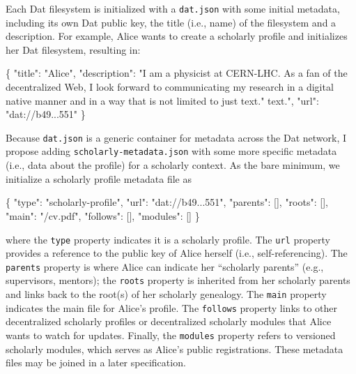 \documentclass[publications,article,submit,moreauthors,pdftex,10pt,a4paper]{Definitions/mdpi}
\newenvironment{Shaded}{\begin{snugshade}}{\end{snugshade}}
\newcommand{\DataTypeTok}[1]{\textcolor[rgb]{0.13,0.29,0.53}{#1}}
\newcommand{\FunctionTok}[1]{\textcolor[rgb]{0.00,0.00,0.00}{#1}}
\newcommand{\OtherTok}[1]{\textcolor[rgb]{0.56,0.35,0.01}{#1}}
\newcommand{\StringTok}[1]{\textcolor[rgb]{0.31,0.60,0.02}{#1}}
\begin{document}
Each Dat filesystem is initialized with a \texttt{dat.json} with some
initial metadata, including its own Dat public key, the title (i.e.,
name) of the filesystem and a description. For example, Alice wants to
create a scholarly profile and initializes her Dat filesystem, resulting
in:

\begin{Shaded}
\begin{Highlighting}[]
\FunctionTok{\{}
  \DataTypeTok{"title"}\FunctionTok{:} \StringTok{"Alice"}\FunctionTok{,}
  \DataTypeTok{"description"}\FunctionTok{:} \StringTok{"I am a physicist at CERN-LHC. As a fan of the }
  \StringTok{decentralized Web, I look forward to communicating my research in }
  \StringTok{a digital native manner and in a way that is not limited to just text."}
  \StringTok{text."}\FunctionTok{,}
  \DataTypeTok{"url"}\FunctionTok{:} \StringTok{"dat://b49...551"}
\FunctionTok{\}}
\end{Highlighting}
\end{Shaded}

Because \texttt{dat.json} is a generic container for metadata across the
Dat network, I propose adding \texttt{scholarly-metadata.json} with some
more specific metadata (i.e., data about the profile) for a scholarly
context. As the bare minimum, we initialize a scholarly profile metadata
file as

\begin{Shaded}
\begin{Highlighting}[]
\FunctionTok{\{}
  \DataTypeTok{"type"}\FunctionTok{:} \StringTok{"scholarly-profile"}\FunctionTok{,}
  \DataTypeTok{"url"}\FunctionTok{:} \StringTok{"dat://b49...551"}\FunctionTok{,}
  \DataTypeTok{"parents"}\FunctionTok{:} \OtherTok{[]}\FunctionTok{,}
  \DataTypeTok{"roots"}\FunctionTok{:} \OtherTok{[]}\FunctionTok{,}
  \DataTypeTok{"main"}\FunctionTok{:} \StringTok{"/cv.pdf"}\FunctionTok{,}
  \DataTypeTok{"follows"}\FunctionTok{:} \OtherTok{[]}\FunctionTok{,}
  \DataTypeTok{"modules"}\FunctionTok{:} \OtherTok{[]}
\FunctionTok{\}}
\end{Highlighting}
\end{Shaded}

where the \texttt{type} property indicates it is a scholarly profile.
The \texttt{url} property provides a reference to the public key of
Alice herself (i.e., self-referencing). The \texttt{parents} property
is where Alice can indicate her ``scholarly parents'' (e.g.,
supervisors, mentors); the \texttt{roots} property is inherited from
her scholarly parents and links back to the root(s) of her scholarly
genealogy. The \texttt{main} property indicates the main file for
Alice's profile.  The \texttt{follows} property links to other
decentralized scholarly profiles or decentralized scholarly modules
that Alice wants to watch for updates. Finally, the \texttt{modules}
property refers to versioned scholarly modules, which serves as
Alice's public registrations. These metadata files may be joined in a
later specification.
\end{document}
